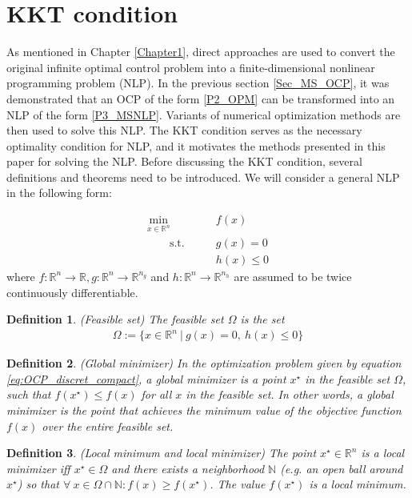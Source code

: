 \documentclass  [
  paper    = a4,
  BCOR     = 10mm,
  twoside,
  fontsize = 12pt,
  fleqn,
  toc      = bibnumbered,
  toc      = listofnumbered,
  numbers  = noendperiod,
  headings = normal,
  listof   = leveldown,
  version  = 3.03
]                                       {scrreprt}
\newcommand{\<}{\langle}
\renewcommand{\>}{\rangle}
\newtheorem{definition}{Definition}
\begin{document}
\section{KKT condition}
\label{Sec_KKT}
As mentioned in Chapter \ref{Chapter1}, direct approaches are used to convert the original infinite optimal control problem into a finite-dimensional nonlinear programming problem (NLP). In the previous section \ref{Sec_MS_OCP}, it was demonstrated that an OCP of the form \ref{P2_OPM} can be transformed into an NLP of the form \ref{P3_MSNLP}. Variants of numerical optimization methods are then used to solve this NLP. The KKT condition serves as the necessary optimality condition for NLP, and it motivates the methods presented in this paper for solving the NLP. Before discussing the KKT condition, several definitions and theorems need to be introduced. We will consider a general NLP in the following form:
 

\begin{equation}
	\label{eq:OCP_discret_compact}
	\begin{aligned}
		\underset{x \in \mathbb{R}^n}{\text{min}} \qquad &f(x)\\
		\qquad \text{s.t.}\qquad&  g(x) = 0   \\
		&  h(x)\leq 0 
	\end{aligned}
\end{equation}
where $f: \mathbb{R}^n \rightarrow \mathbb{R}, g: \mathbb{R}^n \rightarrow \mathbb{R}^{n_g}$ and $h: \mathbb{R}^n \rightarrow \mathbb{R}^{n_h}$ are assumed to be twice continuously differentiable.

\begin{definition}(Feasible set) The feasible set $\Omega$ is the set 
	\begin{align}
		\Omega:= \{x \in \mathbb{R}^n \ | \ g(x)= 0 , \ h(x)\leq 0 \}
	\end{align}
\end{definition}

\begin{definition}(Global minimizer) In the optimization problem given by equation \ref{eq:OCP_discret_compact}, a global minimizer is a point $x^\star$ in the feasible set $\Omega$, such that $f(x^\star) \leq f(x)$ for all $x$ in the feasible set. In other words, a global minimizer is the point that achieves the minimum value of the objective function $f(x)$ over the entire feasible set.
\end{definition}

\begin{definition}(Local minimum and local minimizer) The point $x^\star \in \mathbb{R}^n$ is a local minimizer iff $x^\star \in  \Omega$ and there exists a neighborhood $\mathbb{N}$ (e.g. an open ball around $x^\star$) so that $ \forall \ x \in \Omega \cap \mathbb{N}: f(x) \geq f(x^\star)$. The value $f(x^\star)$ is a local minimum.
\end{definition}
\end{document}
